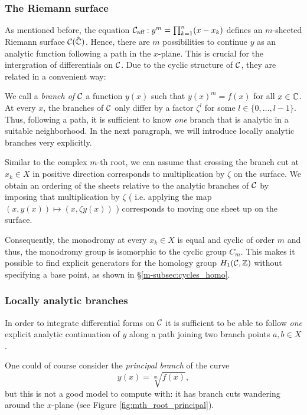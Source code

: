 \documentclass[main.tex]{subfiles}
\begin{document}
  \subsubsection{The Riemann surface}\label{subsec:riemann_surface}

  As mentioned before, the equation $\mathcal{C}_{\text{aff}} : y^m = \prod_{k = 1}^n (x - x_k)$ defines an $m$-sheeted Riemann surface $\mathcal{C}(\hat{\mathbb{C}})$. 
  Hence, there
  are $m$ possibilities to continue $y$ as an analytic function following a path in the $x$-plane. This is crucial for the intergration
  of differentials on $\mathcal{C}$. Due to the cyclic structure of $\mathcal{C}$, they are related in a convenient way:
  
  We call a \emph{branch of $\mathcal{C}$} a function $y(x)$ such that
  $y(x)^m = f(x)$ for all $x \in \mathbb{C}$. At every $x$, the branches of $\mathcal{C}$ only
  differ by a factor $\zeta^l$ for some $l \in \{0,\dots,l-1\}$. Thus, following a path, it is sufficient to know \emph{one} branch that is analytic in a suitable neighborhood. In the
  next paragraph, we will introduce locally analytic branches very explicitly.
  
  \bigskip
  
  Similar to the complex $m$-th root, we can assume that crossing the branch cut at $x_k \in X$ in positive direction corresponds to multiplication by $\zeta$ on the surface. We
  obtain an ordering of the sheets relative to the analytic branches of $\mathcal{C}$ by imposing that multiplication by $\zeta$ ( i.e. applying the map
  $(x,y(x)) \mapsto (x,\zeta y(x))$ ) corresponds to moving one sheet up on the surface.
  
   \bigskip
  
  Consequently, the monodromy at every $x_k \in X$
  is equal and cyclic of order $m$ and thus, the monodromy group is isomorphic to the cyclic group $C_m$. This makes it possible to find explicit generators for the
  homology group $H_1(\mathcal{C},\mathbb{Z})$ without specifying a base point, as shown in \S \ref{m-subsec:cycles_homo}.

  \subsubsection{Locally analytic branches}\label{subsubsec:analytic_branches}

  In order to integrate differential forms on $\mathcal{C}$
  it is sufficient to be able to follow \emph{one} explicit analytic continuation of $y$ along a
  path joining two branch points $a, b \in X$.

  One could of course consider the \emph{principal branch} of the curve
  \begin{equation*}
      y(x) = \sqrt[m]{f(x)},
  \end{equation*}
  but this is not a good model to compute with: it has branch cuts
  wandering around the $x$-plane (see Figure \ref{fig:mth_root_principal}).
  
\end{document}
